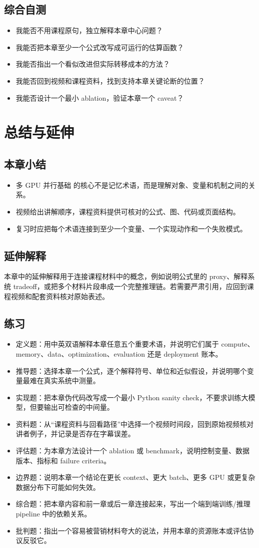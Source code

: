 \documentclass[a4paper]{article}
\begin{document}
\subsection{综合自测}
\begin{itemize}
\item 我能否不用课程原句，独立解释本章中心问题？
\item 我能否把本章至少一个公式改写成可运行的估算函数？
\item 我能否指出一个看似改进但实际转移成本的方法？
\item 我能否回到视频和课程资料，找到支持本章关键论断的位置？
\item 我能否设计一个最小 ablation，验证本章一个 caveat？
\end{itemize}
\section{总结与延伸}
\subsection{本章小结}
\begin{itemize}
\item 多 GPU 并行基础 的核心不是记忆术语，而是理解对象、变量和机制之间的关系。
\item 视频给出讲解顺序，课程资料提供可核对的公式、图、代码或页面结构。
\item 复习时应把每个术语连接到至少一个变量、一个实现动作和一个失败模式。
\end{itemize}
\subsection{延伸解释}
本章中的延伸解释用于连接课程材料中的概念，例如说明公式里的 proxy、解释系统 tradeoff，或把多个材料片段串成一个完整推理链。若需要严肃引用，应回到课程视频和配套资料核对原始表述。
\subsection{练习}
\begin{itemize}
\item 定义题：用中英双语解释本章任意五个重要术语，并说明它们属于 compute、memory、data、optimization、evaluation 还是 deployment 账本。
\item 推导题：选择本章一个公式，逐个解释符号、单位和近似假设，并说明哪个变量最难在真实系统中测量。
\item 实现题：把本章伪代码改写成一个最小 Python sanity check，不要求训练大模型，但要输出可检查的中间量。
\item 资料题：从“课程资料与回看路径”中选择一个视频时间段，回到原始视频核对讲者例子，并记录是否存在字幕误差。
\item 评估题：为本章方法设计一个 ablation 或 benchmark，说明控制变量、数据版本、指标和 failure criteria。
\item 边界题：说明本章一个结论在更长 context、更大 batch、更多 GPU 或更复杂数据分布下可能如何失效。
\item 综合题：把本章内容和前一章或后一章连接起来，写出一个端到端训练/推理 pipeline 中的依赖关系。
\item 批判题：指出一个容易被营销材料夸大的说法，并用本章的资源账本或评估协议反驳它。
\end{itemize}
\end{document}
